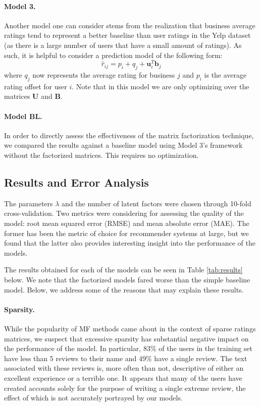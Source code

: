 \documentclass[12pt]{article}
\newcommand{\mbf}[1]{\mathbf{#1}}
\begin{document}
\begin{multicols}{2}
\paragraph{Model 3.} Another model one can consider stems from the realization that business average ratings tend to represent a better baseline than user ratings in the Yelp dataset (as there is a large number of users that have a small amount of ratings). As such, it is helpful to consider a prediction model of the following form:
\begin{equation}
\hat r_{ij} =  p_i + q_j + \mbf u_i^T\mbf b_j
\end{equation}
where $q_j$ now represents the average rating for business $j$ and $p_i$ is the average rating offset for user $i$. Note that in this model we are only optimizing over the matrices $\mbf U$ and $\mbf B$. 

\paragraph{Model BL.} In order to directly assess the effectiveness of the matrix factorization technique, we compared the results against a baseline model using Model 3's framework without the factorized matrices. This requires no optimization.

\subsection{Results and Error Analysis}
The parameters $\lambda$ and the number of latent factors were chosen through 10-fold cross-validation. Two metrics were considering for assessing the quality of the model: root mean squared error (RMSE) and mean absolute error (MAE). The former has been the metric of choice for recommender systems at large, but we found that the latter also provides interesting insight into the performance of the models. 

The results obtained for each of the models can be seen in Table \ref{tab:results} below. We note that the factorized models fared worse than the simple baseline model. Below, we address some of the reasons that may explain these results.

\paragraph{Sparsity.} While the popularity of MF methods came about in the context of sparse ratings matrices, we suspect that excessive sparsity has substantial negative impact on the performance of the model. In particular, 83\% of the users in the training set have less than 5 reviews to their name and 49\% have a single review. The text associated with these reviews is, more often than not, descriptive of either an excellent experience or a terrible one. It appears that many of the users have created accounts solely for the purpose of writing a single extreme review, the effect of which is not accurately portrayed by our models.


\end{multicols}
\end{document}
